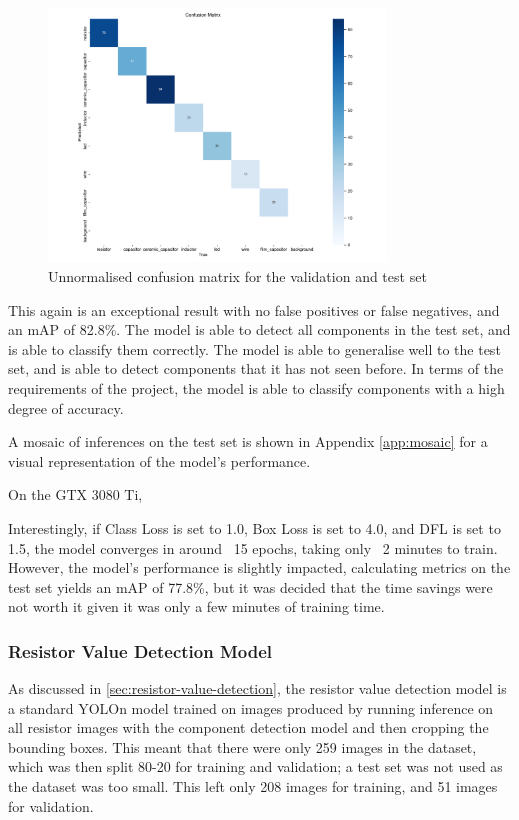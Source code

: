 \begin{figure}[H]
  \centering
  \includegraphics[width=0.8\textwidth]{imgs/graphs/confusion_matrix_final_valtest.png}
  \caption{Unnormalised confusion matrix for the validation and test set}
  \label{fig:final-model-confusion-matrix}
\end{figure}

This again is an exceptional result with no false positives or false negatives, and an mAP of 82.8\%. The model is able to detect all components in the test set, and is able to classify them correctly. The model is able to generalise well to the test set, and is able to detect components that it has not seen before. In terms of the requirements of the project, the model is able to classify components with a high degree of accuracy.

A mosaic of inferences on the test set is shown in Appendix \autoref{app:mosaic} for a visual representation of the model's performance. 

  
On the GTX 3080 Ti, 
  
Interestingly, if Class Loss is set to 1.0, Box Loss is set to 4.0, and DFL is set to 1.5, the model converges in around ~15 epochs, taking only ~2 minutes to train. However, the model's performance is slightly impacted, calculating metrics on the test set yields an mAP of 77.8\%, but it was decided that the time savings were not worth it given it was only a few minutes of training time.


\subsubsection{Resistor Value Detection Model}
As discussed in \autoref{sec:resistor-value-detection}, the resistor value detection model is a standard YOLOn model trained on images produced by running inference on all resistor images with the component detection model and then cropping the bounding boxes. This meant that there were only 259 images in the dataset, which was then split 80-20 for training and validation; a test set was not used as the dataset was too small. This left only 208 images for training, and 51 images for validation.

